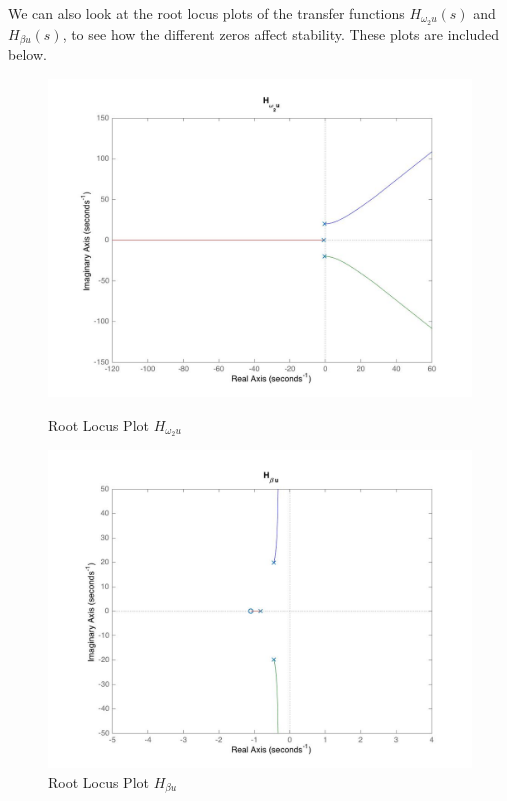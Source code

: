 \documentclass[11pt,titlepage]{article}
\begin{document}
     We can also look at the root locus plots of the transfer functions $H_{\omega_{2}u}(s)$ and $H_{\beta u}(s)$, to see how the different zeros affect stability. These plots are included below.
       \begin{figure}[H]
            \centering
            \begin{minipage}{.5\textwidth}
                \centering
              	\includegraphics[trim={6cm 0 0 0},clip,origin=c,scale=0.25]{rlplot_w2}
            	\caption{Root Locus Plot $H_{\omega_{2}u}$}
           	\label{fig:disc_sys}
            \end{minipage}%
            \begin{minipage}{.5\textwidth}
                \centering
                \includegraphics[trim={6cm 0 0 0},clip,origin=c,scale=0.25]{rlplot_B}
            \caption{Root Locus Plot $H_{\beta u}$}
            \label{fig:disc_sys}
            \end{minipage}%
       \end{figure}
       
\end{document}
